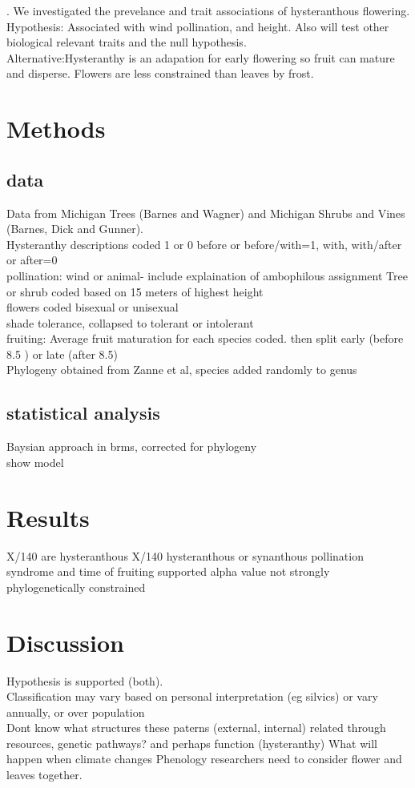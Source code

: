 \documentclass{article}\usepackage[]{graphicx}\usepackage[]{color}
\begin{document}
. We investigated the prevelance and trait associations of hysteranthous flowering.\\
Hypothesis: Associated with wind pollination, and height. Also will test other biological relevant traits and the null hypothesis.\\
Alternative:Hysteranthy is an adapation for early flowering so fruit can mature and disperse. Flowers are less constrained than leaves by frost.

\section{Methods}
\subsection{data}
Data from Michigan Trees (Barnes and Wagner) and Michigan Shrubs and Vines (Barnes, Dick and Gunner).\\
Hysteranthy descriptions coded 1 or 0 before or before/with=1, with, with/after or after=0\\
pollination: wind or animal- include explaination of ambophilous assignment
Tree or shrub coded based on 15 meters of highest height\\
flowers coded bisexual or unisexual\\
shade tolerance, collapsed to tolerant or intolerant\\
fruiting: Average fruit maturation for each species coded. then split early (before 8.5 ) or late (after 8.5)\\
Phylogeny obtained from Zanne et al, species added randomly to genus
\subsection{statistical analysis}
Baysian approach in brms, corrected for phylogeny\\
show model
\section{Results}
X/140 are hysteranthous
X/140 hysteranthous or synanthous
pollination syndrome and time of fruiting supported
alpha value not strongly phylogenetically constrained
\section{Discussion}
Hypothesis is supported (both).\\
Classification may vary based on personal interpretation (eg silvics) or vary annually, or over population\\
Dont know what structures these paterns (external, internal)
related through resources, genetic pathways? and perhaps function (hysteranthy)
What will happen when climate changes
Phenology researchers need to consider flower and leaves together.
\end{document}
